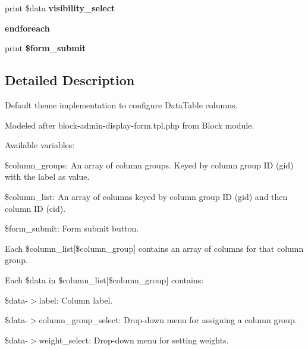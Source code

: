 \begin{DoxyCompactItemize}
print \$data {\bfseries visibility\+\_\+select}
\item 
\mbox{\label{dirt-datatable-admin-search-table-column-settings-form_8tpl_8php_a672d9707ef91db026c210f98cc601123}} 
{\bfseries endforeach}
\item 
\mbox{\label{dirt-datatable-admin-search-table-column-settings-form_8tpl_8php_a781a0b4540f3c04b33978b845353b2ab}} 
print {\bfseries \$form\+\_\+submit}
\end{DoxyCompactItemize}


\subsection{Detailed Description}
Default theme implementation to configure Data\+Table columns.

Modeled after block-\/admin-\/display-\/form.\+tpl.\+php from Block module.

Available variables\+:
\begin{DoxyItemize}
\item \$column\+\_\+groups\+: An array of column groups. Keyed by column group ID (gid) with the label as value.
\item \$column\+\_\+list\+: An array of columns keyed by column group ID (gid) and then column ID (cid).
\item \$form\+\_\+submit\+: Form submit button.
\end{DoxyItemize}

Each \$column\+\_\+list\mbox{[}\$column\+\_\+group\mbox{]} contains an array of columns for that column group.

Each \$data in \$column\+\_\+list\mbox{[}\$column\+\_\+group\mbox{]} contains\+:
\begin{DoxyItemize}
\item \$data-\/$>$label\+: Column label.
\item \$data-\/$>$column\+\_\+group\+\_\+select\+: Drop-\/down menu for assigning a column group.
\item \$data-\/$>$weight\+\_\+select\+: Drop-\/down menu for setting weights. 
\end{DoxyItemize}